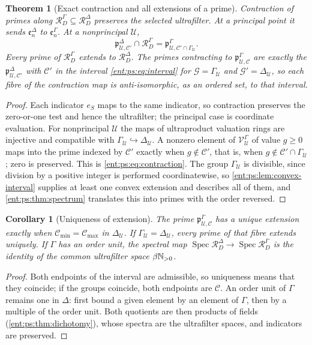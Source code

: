 \documentclass[11pt]{article}
\newtheorem{theorem}{Theorem}[section]
\theoremstyle{plain}
\theoremstyle{plain}
\theoremstyle{plain}
\newtheorem{corollary}[corollary]{Corollary}
\theoremstyle{definition}
\theoremstyle{definition}
\theoremstyle{definition}
\theoremstyle{definition}
\theoremstyle{remark}
\DeclareMathOperator{\Spec}{Spec}\DeclareMathOperator{\red}{red}
\newcommand{\RD}{\mathcal R_D}\newcommand{\Ucal}{\mathcal U}
\begin{document}
\begin{theorem}[Exact contraction and all extensions of a prime]
\label{ent:ps:thm:contraction}
Contraction of primes along $\RD^\Gamma\subseteq\RD^\Delta$ preserves the
selected ultrafilter. At a principal point it sends $\mathfrak e_n^\Delta$ to
$\mathfrak e_n^\Gamma$. At a nonprincipal $\Ucal$,
\begin{equation}\label{ent:ps:eq:contraction}
 \mathfrak p^\Delta_{\Ucal,\mathcal C'}\cap\RD^\Gamma
 =\mathfrak p^\Gamma_{\Ucal,\mathcal C'\cap\Gamma_\Ucal}.
\end{equation}
Every prime of $\RD^\Gamma$ extends to $\RD^\Delta$. The primes contracting
to $\mathfrak p^\Gamma_{\Ucal,\mathcal C}$ are exactly the
$\mathfrak p^\Delta_{\Ucal,\mathcal C'}$ with $\mathcal C'$ in the interval
\eqref{ent:ps:eq:interval} for $\mathcal G=\Gamma_\Ucal$ and
$\mathcal G'=\Delta_\Ucal$, so each fibre of the contraction map is
anti-isomorphic, as an ordered set, to that interval.
\end{theorem}
\begin{proof}
Each indicator $e_S$ maps to the same indicator, so contraction preserves
the zero-or-one test and hence the ultrafilter; the principal case is
coordinate evaluation. For nonprincipal $\Ucal$ the maps of ultraproduct
valuation rings are injective and compatible with
$\Gamma_\Ucal\hookrightarrow\Delta_\Ucal$. A nonzero element of
$\mathcal V_\Ucal^\Gamma$ of value $g\ge0$ maps into the prime indexed by
$\mathcal C'$ exactly when $g\notin\mathcal C'$, that is, when
$g\notin\mathcal C'\cap\Gamma_\Ucal$; zero is preserved. This is
\eqref{ent:ps:eq:contraction}. The group $\Gamma_\Ucal$ is divisible, since
division by a positive integer is performed coordinatewise, so
\cref{ent:ps:lem:convex-interval} supplies at least one convex extension and
describes all of them, and \cref{ent:ps:thm:spectrum} translates this into
primes with the order reversed.
\end{proof}

\begin{corollary}[Uniqueness of extension]\label{ent:ps:cor:unique-extension}
The prime $\mathfrak p^\Gamma_{\Ucal,\mathcal C}$ has a unique extension
exactly when $\mathcal C_{\min}=\mathcal C_{\max}$ in $\Delta_\Ucal$. If
$\Gamma_\Ucal=\Delta_\Ucal$, every prime of that fibre extends uniquely. If
$\Gamma$ has an order unit, the spectral map
$\Spec\RD^\Delta\to\Spec\RD^\Gamma$ is the identity of the common
ultrafilter space $\beta\mathbb N_{>0}$.
\end{corollary}
\begin{proof}
Both endpoints of the interval are admissible, so uniqueness means that they
coincide; if the groups coincide, both endpoints are $\mathcal C$. An order
unit of $\Gamma$ remains one in $\Delta$: first bound a given element by an
element of $\Gamma$, then by a multiple of the order unit. Both quotients are
then products of fields (\cref{ent:ps:thm:dichotomy}), whose spectra are the
ultrafilter spaces, and indicators are preserved.
\end{proof}
\end{document}
